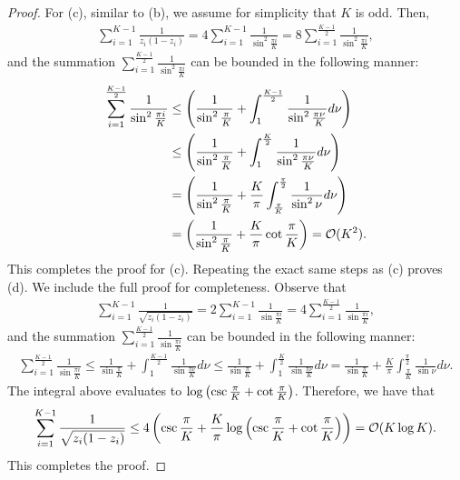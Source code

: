 \begin{proof}
    For (c), similar to (b), we assume for simplicity that $K$ is odd. Then, \begin{align*}
        \sum_{i = 1} ^ {K - 1} \frac{1}{z_{i} (1 - z_{i})} = 4 \sum_{i = 1} ^ {K - 1} \frac{1}{\sin ^ {2} \frac{\pi i}{K}} = 8\sum_{i = 1} ^ {\frac{K - 1}{2}} \frac{1}{\sin ^ {2} \frac{\pi i}{K}}, \end{align*}
        and the summation $\sum_{i = 1} ^ {\frac{K - 1}{2}} \frac{1}{\sin ^ {2} \frac{\pi i}{K}}$ can be bounded in the following manner:
        \begin{align*}
        \sum_{i = 1} ^ {\frac{K - 1}{2}} \frac{1}{\sin ^ {2} \frac{\pi i}{K}} &\le \left( \frac{1}{\sin ^ {2} \frac{\pi}{K}} + \int_{1} ^ {\frac{K - 1}{2}} \frac{1}{\sin ^ {2} \frac{\pi \nu}{K}} d\nu \right) \\
        &\le  \left( \frac{1}{\sin ^ {2} \frac{\pi}{K}} + \int_{1} ^ {\frac{K}{2}} \frac{1}{\sin ^ {2} \frac{\pi \nu}{K}} d\nu \right) \\
        &= \left( \frac{1}{\sin ^ {2} \frac{\pi}{K}} + \frac{K}{\pi}\int_{\frac{\pi}{K}} ^ {\frac{\pi}{2}} \frac{1}{\sin ^ 2 \nu} d\nu \right) \\
        &= \left( \frac{1}{\sin ^ {2} \frac{\pi}{K}} + \frac{K}{\pi} \cot \frac{\pi}{K} \right) = \mathcal{O}(K ^ {2}).
    \end{align*}
    This completes the proof for (c). Repeating the exact same steps as (c) proves (d). We include the full proof for completeness. Observe that \begin{align*}
        \sum_{i = 1} ^ {K - 1} \frac{1}{\sqrt{z_{i} (1 - z_{i})}} = 2 \sum_{i = 1} ^ {K - 1} \frac{1}{\sin \frac{\pi i}{K}} = 4 \sum_{i = 1} ^ {\frac{K - 1}{2}} \frac{1}{\sin \frac{\pi i}{K}}, 
    \end{align*}
    and the summation $\sum_{i = 1} ^ {\frac{K - 1}{2}} \frac{1}{\sin \frac{\pi i}{K}}$ can be bounded in the following manner: \begin{align*}
        \sum_{i = 1} ^ {\frac{K - 1}{2}} \frac{1}{ \sin \frac{\pi i}{K}} \le \frac{1}{\sin \frac{\pi}{K}} + \int_{1} ^ {\frac{K - 1}{2}} \frac{1}{\sin \frac{\pi \nu}{K}} d\nu \le \frac{1}{\sin \frac{\pi}{K}} + \int_{1} ^ {\frac{K}{2}} \frac{1}{\sin \frac{\pi \nu}{K}} d\nu = {\frac{1}{\sin \frac{\pi}{K}} + \frac{K}{\pi}\int_{\frac{\pi}{K}} ^ {\frac{\pi}{2}} \frac{1}{\sin \nu} d\nu}.
    \end{align*}
    The integral above evaluates to $\log \left( \csc \frac{\pi}{K} + \cot \frac{\pi}{K} \right)$. Therefore, we have that \begin{align*}
        \sum_{i = 1} ^ {K - 1} \frac{1}{\sqrt{z_{i} (1 - z_{i})}} \le 4\left( \csc \frac{\pi}{K} + \frac{K}{\pi} \log \left( \csc \frac{\pi}{K} + \cot \frac{\pi}{K} \right) \right) = \mathcal{O}(K \log K).
    \end{align*}
    This completes the proof.
\end{proof}

